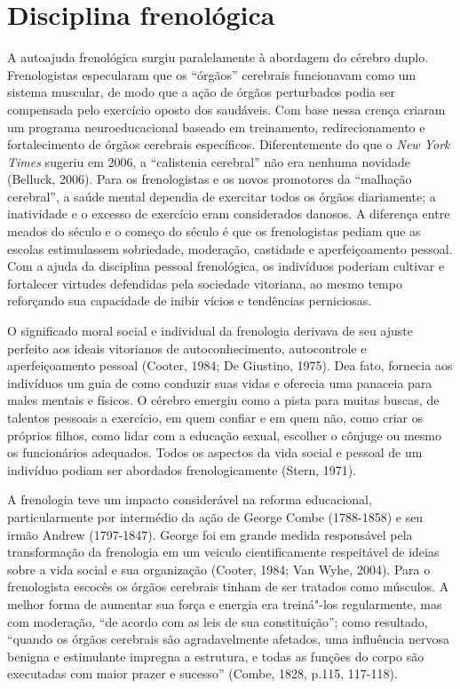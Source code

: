 \chapter{Disciplina frenológica}

A autoajuda frenológica surgiu paralelamente à abordagem do cérebro
duplo. Frenologistas especularam que os ``órgãos'' cerebrais funcionavam
como um sistema muscular, de modo que a ação de órgãos perturbados podia
ser compensada pelo exercício oposto dos saudáveis. Com base nessa
crença criaram um programa neuroeducacional baseado em treinamento,
redirecionamento e fortalecimento de órgãos cerebrais específicos.
Diferentemente do que o \emph{New York Times} sugeriu em 2006, a
``calistenia cerebral'' não era nenhuma novidade (Belluck, 2006). Para
os frenologistas e os novos promotores da ``malhação cerebral'', a saúde
mental dependia de exercitar todos os órgãos diariamente; a inatividade
e o excesso de exercício eram considerados danosos. A diferença entre
meados do século  e o começo do século  é que os frenologistas
pediam que as escolas estimulassem sobriedade, moderação, castidade e
aperfeiçoamento pessoal. Com a ajuda da disciplina pessoal frenológica,
os indivíduos poderiam cultivar e fortalecer virtudes defendidas pela
sociedade vitoriana, ao mesmo tempo reforçando sua capacidade de inibir
vícios e tendências perniciosas.

O significado moral social e individual da frenologia derivava de seu
ajuste perfeito aos ideais vitorianos de autoconhecimento, autocontrole
e aperfeiçoamento pessoal (Cooter, 1984; De Giustino, 1975). Dea fato,
fornecia aos indivíduos um guia de como conduzir suas vidas e oferecia
uma panaceia para males mentais e físicos. O cérebro emergiu como a
pista para muitas buscas, de talentos pessoais a exercício, em quem
confiar e em quem não, como criar os próprios filhos, como lidar com a
educação sexual, escolher o cônjuge ou mesmo os funcionários adequados.
Todos os aspectos da vida social e pessoal de um indivíduo podiam ser
abordados frenologicamente (Stern, 1971).

A frenologia teve um impacto considerável na reforma educacional,
particularmente por intermédio da ação de George Combe (1788-1858) e seu
irmão Andrew (1797-1847). George foi em grande medida responsável pela
transformação da frenologia em um veiculo cientificamente respeitável de
ideias sobre a vida social e sua organização (Cooter, 1984; Van Wyhe,
2004). Para o frenologista escocês os órgãos cerebrais tinham de ser
tratados como músculos. A melhor forma de aumentar sua força e energia
era treiná"-los regularmente, mas com moderação, ``de acordo com as leis
de sua constituição''; como resultado, ``quando os órgãos cerebrais são
agradavelmente afetados, uma influência nervosa benigna e estimulante
impregna a estrutura, e todas as funções do corpo são executadas com
maior prazer e sucesso'' (Combe, 1828, p.115, 117-118).

